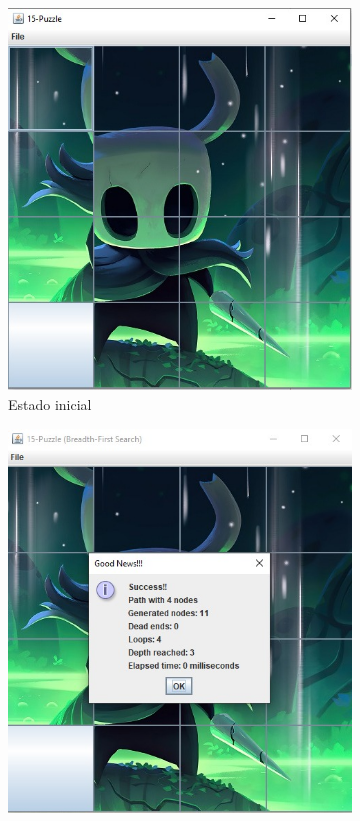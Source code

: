         \begin{figure}[!h]
          \centering
          \begin{subfigure}{0.3\textwidth}
            \includegraphics[width=\textwidth]{Imagenes/inicial3.jpg}
            \caption{Estado inicial}
          \end{subfigure}
          \hfill
          \begin{subfigure}{0.3\textwidth}
            \includegraphics[width=\textwidth]{Imagenes/bfs3.jpg}

\end{subfigure}
\end{figure}
